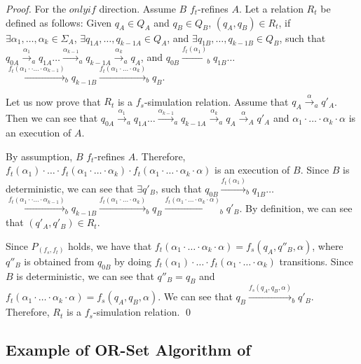 \begin {proof}
For the $\mathit{only if}$ direction. Assume $B$ $f_t$-refines $A$. Let a relation $R_t$ be defined as follows: Given $q_A \in Q_A$ and $q_B \in Q_B$, $(q_A,q_B) \in R_t$, if $\exists \alpha_1, \ldots, \alpha_k \in \Sigma_A$, $\exists q_{1A},\ldots,q_{k-1A} \in Q_A$, and $\exists q_{1B},\ldots,q_{k-1B} \in Q_B$, such that $q_{0A} {\xrightarrow{\alpha_1}}_a q_{1A} \ldots {\xrightarrow{\alpha_{k-1}}}_a q_{k-1A} {\xrightarrow{\alpha_k}}_a q_A$, and $q_{0B} {\xrightarrow{f_t(\alpha_1)}}_b q_{1B} \ldots$ ${\xrightarrow{f_t(\alpha_1 \cdot \cdot \ldots \cdot \alpha_{k-1})}}_b q_{k-1B} {\xrightarrow{f_t(\alpha_1 \cdot \ldots \cdot \alpha_k)}}_b q_B$.

Let us now prove that $R_t$ is a $f_s$-simulation relation. Assume that $q_A {\xrightarrow{\alpha}}_a q'_A$. Then we can see that $q_{0A} {\xrightarrow{\alpha_1}}_a q_{1A} \ldots {\xrightarrow{\alpha_{k-1}}}_a q_{k-1A} {\xrightarrow{\alpha_k}}_a q_A {\xrightarrow{\alpha}}_A q'_A$ and $\alpha_1 \cdot \ldots \cdot \alpha_k \cdot \alpha$ is an execution of $A$.

By assumption, $B$ $f_t$-refines $A$. Therefore, $f_t(\alpha_1) \cdot \ldots \cdot f_t(\alpha_1 \cdot \ldots \cdot \alpha_k) \cdot f_t(\alpha_1 \cdot \ldots \cdot \alpha_k \cdot \alpha)$ is an execution of $B$. Since $B$ is deterministic, we can see that $\exists q'_B$, such that $q_{0B} {\xrightarrow{f_t(\alpha_1)}}_b q_{1B} \ldots$ ${\xrightarrow{f_t(\alpha_1 \cdot \cdot \ldots \cdot \alpha_{k-1})}}_b q_{k-1B} {\xrightarrow{f_t(\alpha_1 \cdot \ldots \cdot \alpha_k)}}_b q_B {\xrightarrow{f_t(\alpha_1 \cdot \ldots \cdot \alpha_k \cdot \alpha)}}_b q'_B$. By definition, we can see that $(q'_A,q'_B) \in R_t$.

Since $P_{(f_s,f_t)}$ holds, we have that $f_t(\alpha_1 \cdot \ldots \cdot \alpha_k \cdot \alpha) = f_s(q_A,q''_B,\alpha)$, where $q''_B$ is obtained from $q_{0B}$ by doing $f_t(\alpha_1) \cdot \ldots \cdot f_t(\alpha_1 \cdot \ldots \cdot \alpha_k)$ transitions. Since $B$ is deterministic, we can see that $q''_B = q_B$ and $f_t(\alpha_1 \cdot \ldots \cdot \alpha_k \cdot \alpha) = f_s(q_A,q_B,\alpha)$. We can see that $q_B {\xrightarrow{f_s(q_A,q_B,\alpha)}}_b q'_B$. Therefore, $R_t$ is a $f_s$-simulation relation. \qed
\end {proof}






\subsection{Example of OR-Set Algorithm of \cite{Shapiro:2011}}
\label{subsec:example of or-set algorithm that assumes causal delivery}


